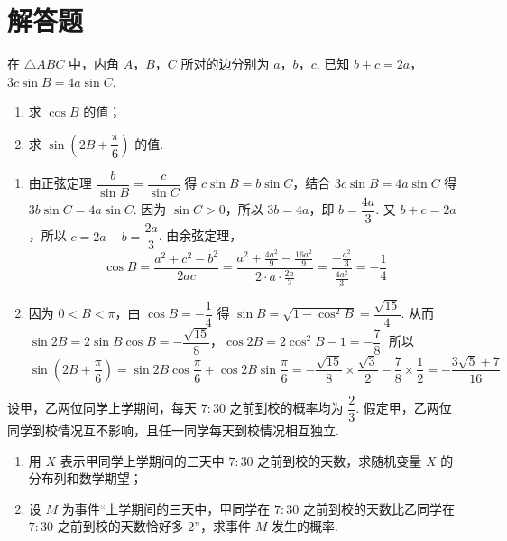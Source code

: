 \section{解答题}

\begin{problem}
在 \( \triangle ABC \) 中，内角 \(A\)，\(B\)，\(C\) 所对的边分别为 \(a\)，\(b\)，\(c\). 已知 \( b+c=2a \)，\( 3c\sin B=4a\sin C \).

\begin{enumerate}
\item 求 \( \cos B \) 的值；
\item 求 \( \sin \left( 2B+\dfrac{\pi}{6} \right) \) 的值.
\end{enumerate}
\end{problem}

\begin{solution}
\begin{enumerate}
\item 由正弦定理 \(\dfrac{b}{\sin B}=\dfrac{c}{\sin C}\) 得 \(c\sin B=b\sin C\)，结合 \(3c\sin B=4a\sin C\) 得 \(3b\sin C=4a\sin C\). 因为 \(\sin C>0\)，所以 \(3b=4a\)，即 \(b=\dfrac{4a}{3}\). 又 \(b+c=2a\)，所以 \(c=2a-b=\dfrac{2a}{3}\). 由余弦定理，
\[
\cos B=\frac{a^2+c^2-b^2}{2ac}=\frac{a^2+\frac{4a^2}{9}-\frac{16a^2}{9}}{2\cdot a\cdot\frac{2a}{3}}=\frac{-\frac{a^2}{3}}{\frac{4a^2}{3}}=-\frac14
\]
\item 因为 \(0<B<\pi\)，由 \(\cos B=-\dfrac14\) 得 \(\sin B=\sqrt{1-\cos^2B}=\dfrac{\sqrt{15}}{4}\). 从而 \(\sin 2B=2\sin B\cos B=-\dfrac{\sqrt{15}}{8}\)，\(\cos 2B=2\cos^2B-1=-\dfrac78\). 所以
\[
\sin\left(2B+\frac\pi6\right)=\sin 2B\cos\frac\pi6+\cos 2B\sin\frac\pi6=-\frac{\sqrt{15}}{8}\times\frac{\sqrt3}{2}-\frac78\times\frac12=-\frac{3\sqrt5+7}{16}
\]
\end{enumerate}
\end{solution}


\begin{problem}
设甲，乙两位同学上学期间，每天 \( 7{:}30 \) 之前到校的概率均为 \( \dfrac{2}{3} \). 假定甲，乙两位同学到校情况互不影响，且任一同学每天到校情况相互独立.

\begin{enumerate}
\item 用 \(X\) 表示甲同学上学期间的三天中 \( 7{:}30 \) 之前到校的天数，求随机变量 \(X\) 的分布列和数学期望；
\item 设 \(M\) 为事件“上学期间的三天中，甲同学在 \( 7{:}30 \) 之前到校的天数比乙同学在 \( 7{:}30 \) 之前到校的天数恰好多 \( 2 \)”，求事件 \(M\) 发生的概率.
\end{enumerate}
\end{problem}

